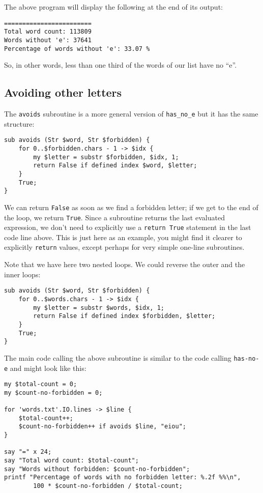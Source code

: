 The above program will display the following at the end 
of its output:

\begin{verbatim}
========================
Total word count: 113809
Words without 'e': 37641
Percentage of words without 'e': 33.07 %
\end{verbatim}

So, in other words, less than one third of the words of 
our list have no ``e''.

\subsection{Avoiding other letters}

The {\tt avoids} subroutine is a more general version of 
\verb"has_no_e" but it has the same structure:

\begin{verbatim}
sub avoids (Str $word, Str $forbidden) {
    for 0..$forbidden.chars - 1 -> $idx {
        my $letter = substr $forbidden, $idx, 1;
        return False if defined index $word, $letter;
    }
    True;
}
\end{verbatim}
%
We can return {\tt False} as soon as we find a forbidden letter;
if we get to the end of the loop, we return {\tt True}. Since 
a subroutine returns the last evaluated expression, we don't 
need to explicitly use a {\tt return True} statement in the last 
code line above. This is just here as an example, you might 
find it clearer to explicitly {\tt return} values, except 
perhaps for very simple one-line subroutines.

Note that we have here two nested loops. We could reverse the 
outer and the inner loops:

\begin{verbatim}
sub avoids (Str $word, Str $forbidden) {
    for 0..$words.chars - 1 -> $idx {
        my $letter = substr $words, $idx, 1;
        return False if defined index $forbidden, $letter;
    }
    True;
}
\end{verbatim}
%

The main code calling the above subroutine is similar to 
the code calling {\tt has-no-e} and might look like 
this:

\begin{verbatim}
my $total-count = 0;
my $count-no-forbidden = 0;

for 'words.txt'.IO.lines -> $line { 
    $total-count++;
    $count-no-forbidden++ if avoids $line, "eiou";
}

say "=" x 24;
say "Total word count: $total-count";
say "Words without forbidden: $count-no-forbidden";
printf "Percentage of words with no forbidden letter: %.2f %%\n", 
        100 * $count-no-forbidden / $total-count;
\end{verbatim}    
%
  

